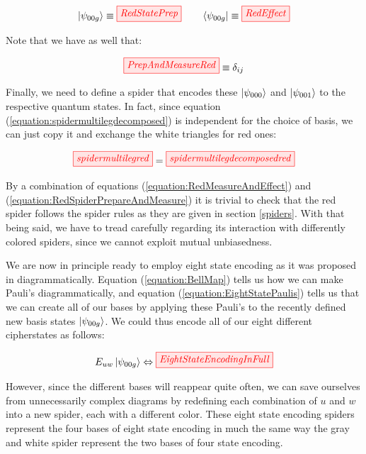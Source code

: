 \documentclass[]{article}
\begin{document}
\begin{equation}
	\ket{\psi_{00g}} \equiv \tikzfig{RedStatePrep} ~~~~~~ \bra{\psi_{00g}} \equiv \tikzfig{RedEffect}
\end{equation}

Note that we have as well that:

\begin{equation}
\label{equation:RedMeasureAndEffect}
\tikzfig{PrepAndMeasureRed} \equiv \delta_{ij}
\end{equation}

Finally, we need to define a spider that encodes these $\ket{\psi_{000}}$ and $\ket{\psi_{001}}$ to the respective quantum states. In fact, since equation (\ref{equation:spidermultilegdecomposed}) is independent for the choice of basis, we can just copy it and exchange the white triangles for red ones:

\begin{equation}
	\label{equation:RedSpiderPrepareAndMeasure}
\tikzfig{spidermultilegred} = \tikzfig{spidermultilegdecomposedred}
\end{equation}

By a combination of equations (\ref{equation:RedMeasureAndEffect}) and (\ref{equation:RedSpiderPrepareAndMeasure}) it is trivial to check that the red spider follows the spider rules as they are given in section \ref{spiders}. With that being said, we have to tread carefully regarding its interaction with differently colored spiders, since we cannot exploit mutual unbiasedness.

We are now in principle ready to employ eight state encoding as it was proposed in \cite{DeVries2016} diagrammatically. Equation (\ref{equation:BellMap}) tells us how we can make Pauli's diagrammatically, and equation (\ref{equation:EightStatePaulis}) tells us that we can create all of our bases by applying these Pauli's to the recently defined new basis states $\ket{\psi_{00g}}$. We could thus encode all of our eight different cipherstates as follows:

\begin{equation}
	\label{equation:EightStateEncodingInFull}
	E_{uw}\ket{\psi_{00g}} \Leftrightarrow\tikzfig{EightStateEncodingInFull}
\end{equation}

However, since the different bases will reappear quite often, we can save ourselves from unnecessarily complex diagrams by redefining each combination of $u$ and $w$ into a new spider, each with a different color. These eight state encoding spiders represent the four bases of eight state encoding in much the same way the gray and white spider represent the two bases of four state encoding.
\end{document}

